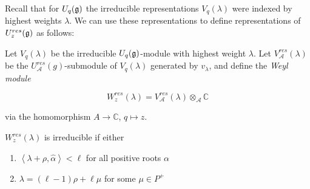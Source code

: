 Recall that for $U_q(\mathfrak{g})$ the irreducible representations $V_q(\lambda)$
were indexed by highest weights $\lambda$. We can use these representations to
define representations of $U_z^{res}(\mathfrak{g})$ as follows:


Let $V_q(\lambda)$ be the irreducible $U_q(\mathfrak{g})$-module with highest weight
$\lambda$. Let $V_\mathcal{A}^{res}(\lambda)$ be the
$U_\mathcal{A}^{res}(g)$-submodule of $V_q(\lambda)$ generated by $v_\lambda$,
and define the \emph{Weyl module}

\begin{equation}
    W_z^{res}(\lambda) = V_\mathcal{A}^{res}(\lambda) \otimes_\mathcal{A} \mathbb{C}
\end{equation}

via the homomorphism $A \to \mathbb{C}$, $q \mapsto z$.

\begin{claim}
    $W_z^{res}(\lambda)$ is irreducible if either 
    \begin{enumerate}
        \item $\left< \lambda + \rho, \hat{\alpha}\right> < \ell$ for all positive
            roots $\alpha$
        \item $\lambda = (\ell - 1) \rho + \ell \mu$ for some $\mu \in P^+$
    \end{enumerate}
\end{claim}
